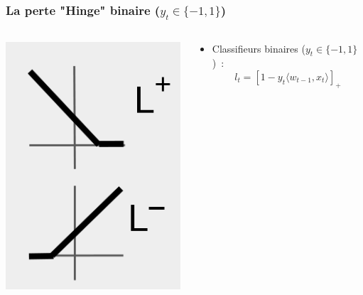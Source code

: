 \documentclass{beamer}
\begin{document}
\begin{frame}
	\frametitle{La perte "Hinge" binaire ($y_t \in \{-1,1\}$)}
	\begin{columns}
		\begin{column}{.2 \linewidth}
			\centerline{\includegraphics[width=\linewidth]{figs/cap-loss.png}}
		\end{column}
		\begin{column}{.8 \linewidth}
			\begin{itemize}
				\item Classifieurs binaires ($y_t \in \{-1,1\}$)~:
				$$ l_t = \left[1 - y_t \langle w_{t-1}, x_t \rangle \right]_+$$
			
			\end{itemize}
		\end{column}		
	\end{columns}
\end{frame}
\end{document}
